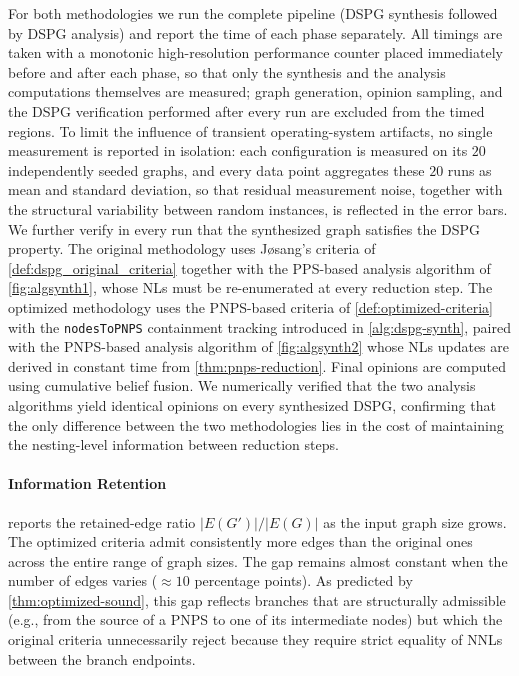 For both methodologies we run the complete pipeline (\ac{DSPG} synthesis followed by \ac{DSPG} analysis) and report the time of each phase separately. All timings are taken with a monotonic high-resolution performance counter placed immediately before and after each phase, so that only the synthesis and the analysis computations themselves are measured; graph generation, opinion sampling, and the \ac{DSPG} verification performed after every run are excluded from the timed regions. To limit the influence of transient operating-system artifacts, no single measurement is reported in isolation: each configuration is measured on its $20$ independently seeded graphs, and every data point aggregates these $20$ runs as mean and standard deviation, so that residual measurement noise, together with the structural variability between random instances, is reflected in the error bars. We further verify in every run that the synthesized graph satisfies the \ac{DSPG} property. The original methodology uses J{\o}sang's criteria of \cref{def:dspg_original_criteria} together with the \ac{PPS}-based analysis algorithm of \cref{fig:algsynth1}, whose \acp{NL} must be re-enumerated at every reduction step. The optimized methodology uses the \ac{PNPS}-based criteria of \cref{def:optimized-criteria} with the \texttt{nodesToPNPS} containment tracking introduced in \cref{alg:dspg-synth}, paired with the \ac{PNPS}-based analysis algorithm of \cref{fig:algsynth2} whose \acp{NL} updates are derived in constant time from \cref{thm:pnps-reduction}. Final opinions are computed using cumulative belief fusion. We numerically verified that the two analysis algorithms yield identical opinions on every synthesized \ac{DSPG}, confirming that the only difference between the two methodologies lies in the cost of maintaining the nesting-level information between reduction steps.

\paragraph{Information Retention}

 reports the retained-edge ratio $\lvert E(G')\rvert / \lvert E(G)\rvert$ as the input graph size grows. The optimized criteria admit consistently more edges than the original ones across the entire range of graph sizes. The gap remains almost constant when the number of edges varies ($\approx\!10$ percentage points). As predicted by \cref{thm:optimized-sound}, this gap reflects branches that are structurally admissible (e.g., from the source of a \ac{PNPS} to one of its intermediate nodes) but which the original criteria unnecessarily reject because they require strict equality of \acp{NNL} between the branch endpoints.


